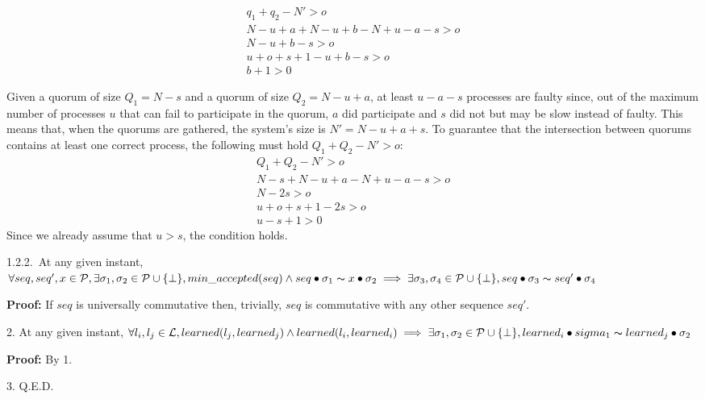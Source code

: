 \indent\indent\indent\indent\indent\indent\parbox{\linewidth-\algorithmicindent*6}{
\begin{align*}
	q_1+q_2-N'>o \\
	N-u+a+N-u+b-N+u-a-s>o \\
	N-u+b-s>o \\
	u+o+s+1-u+b-s>o\\
	b+1>0
\end{align*}}
\indent\indent\indent\indent\indent\indent\parbox{\linewidth-\algorithmicindent*6}{
Given a quorum of size $Q_1=N-s$ and a quorum of size $Q_2=N-u+a$, at least $u-a-s$ processes are faulty since, out of the maximum number of processes $u$ that can fail to participate in the quorum, $a$ did participate and $s$ did not but may be slow instead of faulty. This means that, when the quorums are gathered, the system's size is $N'=N-u+a+s$. To guarantee that the intersection between quorums contains at least one correct process, the following must hold $Q_1+Q_2-N'>o$: 
\begin{align*}
	Q_1+Q_2-N'>o \\
	N-s+N-u+a-N+u-a-s>o\\
	N-2s>o\\
	u+o+s+1-2s>o\\
	u-s+1>0
\end{align*}
Since we already assume that $u>s$, the condition holds.}
\indent\indent\indent\indent\indent\parbox{\linewidth-\algorithmicindent*5}{\strut1.2.2.~At any given instant, $\forall seq,seq',x \in \mathcal{P},\exists \sigma_1,\sigma_2 \in \mathcal{P} \cup \{\bot\}, min\_accepted(seq) \land seq \bullet \sigma_1 \thicksim x \bullet \sigma_2  \implies \exists \sigma_3,\sigma_4 \in \mathcal{P} \cup \{\bot\}, seq \bullet \sigma_3 \thicksim seq' \bullet \sigma_4$} \par
\indent\indent\indent\indent\indent\indent\parbox{\linewidth-\algorithmicindent*6}{\strut\textbf{Proof:} If $seq$ is universally commutative then, trivially, $seq$ is commutative with any other sequence $seq'$.}
\indent\parbox{\linewidth-\algorithmicindent}{\strut2. At any given instant, $\forall l_i,l_j \in \mathcal{L}, learned(l_j,learned_j) \land learned(l_i,learned_i) \implies \exists \sigma_1,\sigma_2 \in \mathcal{P} \cup \{\bot\}, learned_i \bullet sigma_1 \thicksim learned_j \bullet \sigma_2$}\par
\indent\indent\parbox{\linewidth}{\strut\textbf{Proof:} By 1.}\par
\indent\parbox{\linewidth-\algorithmicindent}{\strut3. Q.E.D.} \par


